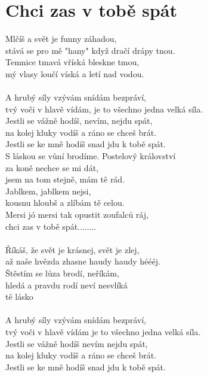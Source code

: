 \section{Chci zas v tobě spát}
Mlčíš a svět je funny záhadou, \\
stává se pro mě "hany" když dračí drápy tnou. \\
Temnice tmavá vříská bleskne tmou, \\
mý vlasy loučí víská a letí nad vodou. \\
\\
A hrubý síly vzývám snídám bezpráví, \\
tvý voči v hlavě vídám, je to všechno jedna velká síla. \\
Jestli se vážně hodíš, nevím, nejdu spát, \\
na kolej kluky vodíš a ráno se chceš brát. \\
Jestli se ke mně hodíš snad jdu k tobě spát. \\
S láskou se vůní brodíme. Postelový království\\
za koně nechce se mi dát,\\
jsem na tom stejně, mám tě rád. \\
Jablkem, jablkem nejsi, \\
kousnu hloubš a zlíbám tě celou. \\
Mersi jó mersi tak opustit zoufalců ráj, \\
chci zas v tobě spát........\\
\\
Říkáš, že svět je krásnej, svět je zlej, \\
až naše hvězda zhasne haudy haudy héééj. \\
Štěstím se lůza brodí, neříkám, \\
hledá a pravdu rodí neví nesvlíká \\
tě lásko \\
\\
A hrubý síly vzývám snídám bezpráví, \\
tvý voči v hlavě vídám je to všechno jedna velká síla. \\
Jestli se vážně hodíš nevím nejdu spát, \\
na kolej kluky vodíš a ráno se chceš brát. \\
Jestli se ke mně hodíš snad jdu k tobě spát. \\
